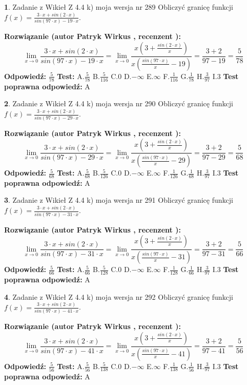 \documentclass[12pt, a4paper]{article}
\theoremstyle{definition} %
\newtheorem{zad}{}
\newcommand{\zadStart}[1]{\begin{zad}#1\newline}
\newcommand{\zadStop}{\end{zad}}
\newcommand{\rozwStart}[2]{\noindent \textbf{Rozwiązanie (autor #1 , recenzent #2): }\newline}
\newcommand{\rozwStop}{\newline}
\newcommand{\odpStart}{\noindent \textbf{Odpowiedź:}\newline}
\newcommand{\odpStop}{\newline}
\newcommand{\testStart}{\noindent \textbf{Test:}\newline}
\newcommand{\testStop}{\newline}
\newcommand{\kluczStart}{\noindent \textbf{Test poprawna odpowiedź:}\newline}
\newcommand{\kluczStop}{\newline}
\begin{document}
\zadStart{Zadanie z Wikieł Z 4.4 k) moja wersja nr 289}
Obliczyć granicę funkcji $f(x)=\frac{3\cdot x +sin(2\cdot x)}{sin(97\cdot x) -19\cdot x}$.
\zadStop
\rozwStart{Patryk Wirkus}{}
$$\lim\limits_{x\to 0}\frac{3\cdot x +sin(2\cdot x)}{sin(97\cdot x) -19\cdot x}
=\lim\limits_{x\to 0}\frac{x(3+\frac{sin(2\cdot x)}{x})}{x(\frac{sin(97\cdot x)}{x}-19)}
=\frac{3+2}{97-19} = \frac{5}{78}$$
\rozwStop
\odpStart
$\frac{5}{78}$
\odpStop
\testStart
A.$\frac{5}{78}$
B.$\frac{5}{116}$
C.$0$
D.$-\infty$
E.$\infty$
F.$\frac{1}{116}$
G.$\frac{1}{78}$
H.$\frac{3}{97}$
I.$3$
\testStop
\kluczStart
A
\kluczStop



\zadStart{Zadanie z Wikieł Z 4.4 k) moja wersja nr 290}
Obliczyć granicę funkcji $f(x)=\frac{3\cdot x +sin(2\cdot x)}{sin(97\cdot x) -29\cdot x}$.
\zadStop
\rozwStart{Patryk Wirkus}{}
$$\lim\limits_{x\to 0}\frac{3\cdot x +sin(2\cdot x)}{sin(97\cdot x) -29\cdot x}
=\lim\limits_{x\to 0}\frac{x(3+\frac{sin(2\cdot x)}{x})}{x(\frac{sin(97\cdot x)}{x}-29)}
=\frac{3+2}{97-29} = \frac{5}{68}$$
\rozwStop
\odpStart
$\frac{5}{68}$
\odpStop
\testStart
A.$\frac{5}{68}$
B.$\frac{5}{126}$
C.$0$
D.$-\infty$
E.$\infty$
F.$\frac{1}{126}$
G.$\frac{1}{68}$
H.$\frac{3}{97}$
I.$3$
\testStop
\kluczStart
A
\kluczStop



\zadStart{Zadanie z Wikieł Z 4.4 k) moja wersja nr 291}
Obliczyć granicę funkcji $f(x)=\frac{3\cdot x +sin(2\cdot x)}{sin(97\cdot x) -31\cdot x}$.
\zadStop
\rozwStart{Patryk Wirkus}{}
$$\lim\limits_{x\to 0}\frac{3\cdot x +sin(2\cdot x)}{sin(97\cdot x) -31\cdot x}
=\lim\limits_{x\to 0}\frac{x(3+\frac{sin(2\cdot x)}{x})}{x(\frac{sin(97\cdot x)}{x}-31)}
=\frac{3+2}{97-31} = \frac{5}{66}$$
\rozwStop
\odpStart
$\frac{5}{66}$
\odpStop
\testStart
A.$\frac{5}{66}$
B.$\frac{5}{128}$
C.$0$
D.$-\infty$
E.$\infty$
F.$\frac{1}{128}$
G.$\frac{1}{66}$
H.$\frac{3}{97}$
I.$3$
\testStop
\kluczStart
A
\kluczStop



\zadStart{Zadanie z Wikieł Z 4.4 k) moja wersja nr 292}
Obliczyć granicę funkcji $f(x)=\frac{3\cdot x +sin(2\cdot x)}{sin(97\cdot x) -41\cdot x}$.
\zadStop
\rozwStart{Patryk Wirkus}{}
$$\lim\limits_{x\to 0}\frac{3\cdot x +sin(2\cdot x)}{sin(97\cdot x) -41\cdot x}
=\lim\limits_{x\to 0}\frac{x(3+\frac{sin(2\cdot x)}{x})}{x(\frac{sin(97\cdot x)}{x}-41)}
=\frac{3+2}{97-41} = \frac{5}{56}$$
\rozwStop
\odpStart
$\frac{5}{56}$
\odpStop
\testStart
A.$\frac{5}{56}$
B.$\frac{5}{138}$
C.$0$
D.$-\infty$
E.$\infty$
F.$\frac{1}{138}$
G.$\frac{1}{56}$
H.$\frac{3}{97}$
I.$3$
\testStop
\kluczStart
A
\kluczStop
\end{document}
